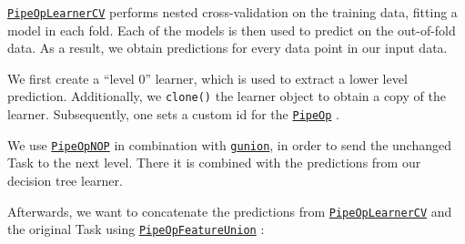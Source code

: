 \documentclass[]{scrbook}
\newenvironment{Shaded}{\begin{snugshade}}{\end{snugshade}}
\newcommand{\DecValTok}[1]{\textcolor[rgb]{0.00,0.00,0.81}{#1}}
\newcommand{\KeywordTok}[1]{\textcolor[rgb]{0.13,0.29,0.53}{\textbf{#1}}}
\newcommand{\NormalTok}[1]{#1}
\newcommand{\OperatorTok}[1]{\textcolor[rgb]{0.81,0.36,0.00}{\textbf{#1}}}
\newcommand{\StringTok}[1]{\textcolor[rgb]{0.31,0.60,0.02}{#1}}
\renewenvironment{Shaded} {\begin{snugshade}\small} {\end{snugshade}}
\begin{document}
\href{https://mlr3pipelines.mlr-org.com/reference/mlr_pipeops_learner_cv.html}{\texttt{PipeOpLearnerCV}} performs nested cross-validation on the training data, fitting a model in each fold.
Each of the models is then used to predict on the out-of-fold data.
As a result, we obtain predictions for every data point in our input data.

We first create a ``level 0'' learner, which is used to extract a lower level prediction.
Additionally, we \texttt{clone()} the learner object to obtain a copy of the learner.
Subsequently, one sets a custom id for the \href{https://mlr3pipelines.mlr-org.com/reference/PipeOp.html}{\texttt{PipeOp}} .

\begin{Shaded}
\end{Shaded}

We use \href{https://mlr3pipelines.mlr-org.com/reference/mlr_pipeops_nop.html}{\texttt{PipeOpNOP}} in combination with \href{https://mlr3pipelines.mlr-org.com/reference/gunion.html}{\texttt{gunion}}, in order to send the unchanged Task to the next level.
There it is combined with the predictions from our decision tree learner.

\begin{Shaded}
\end{Shaded}

Afterwards, we want to concatenate the predictions from \href{https://mlr3pipelines.mlr-org.com/reference/mlr_pipeops_learner_cv.html}{\texttt{PipeOpLearnerCV}} and the original Task using \href{https://mlr3pipelines.mlr-org.com/reference/mlr_pipeops_featureunion.html}{\texttt{PipeOpFeatureUnion}} :

\begin{Shaded}
\end{Shaded}
\end{document}
